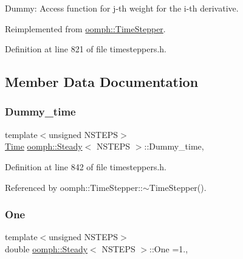 Dummy\+: Access function for j-\/th weight for the i-\/th derivative. 



Reimplemented from \hyperlink{classoomph_1_1TimeStepper_a4cb0aecb044b77ba0553cdd54b586d8a}{oomph\+::\+Time\+Stepper}.



Definition at line 821 of file timesteppers.\+h.



\subsection{Member Data Documentation}
\mbox{\label{classoomph_1_1Steady_a5ef22ed9000bea59c719d9e3e98df267}} 
\subsubsection{\texorpdfstring{Dummy\+\_\+time}{Dummy\_time}}
{\footnotesize\ttfamily template$<$unsigned N\+S\+T\+E\+PS$>$ \\
\hyperlink{classoomph_1_1Time}{Time} \hyperlink{classoomph_1_1Steady}{oomph\+::\+Steady}$<$ N\+S\+T\+E\+PS $>$\+::Dummy\+\_\+time\hspace{0.3cm}{\ttfamily [static]}, {\ttfamily [private]}}



Definition at line 842 of file timesteppers.\+h.



Referenced by oomph\+::\+Time\+Stepper\+::$\sim$\+Time\+Stepper().

\mbox{\label{classoomph_1_1Steady_a4bbc07dac00bd37fa208731f3bd52a0b}} 
\subsubsection{\texorpdfstring{One}{One}}
{\footnotesize\ttfamily template$<$unsigned N\+S\+T\+E\+PS$>$ \\
double \hyperlink{classoomph_1_1Steady}{oomph\+::\+Steady}$<$ N\+S\+T\+E\+PS $>$\+::One =1.\hspace{0.3cm}{\ttfamily [static]}, {\ttfamily [private]}}



